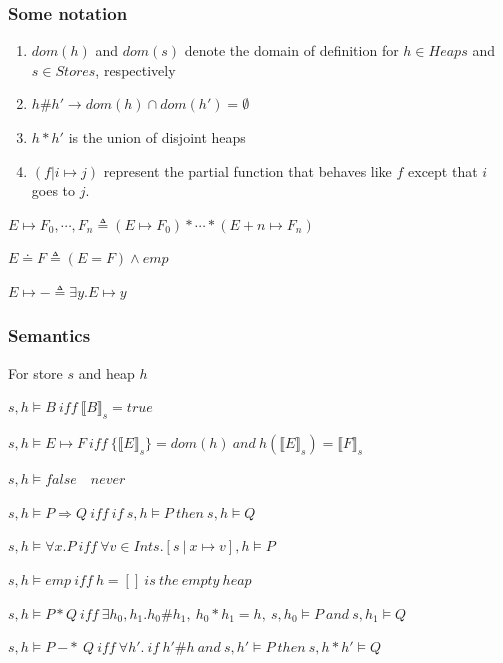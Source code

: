 \documentclass{beamer}
\begin{document}
    \begin{frame}
        \frametitle{Some notation}
        \begin{enumerate}
            \item $dom(h)$ and $dom(s)$ denote the domain of definition
            for $h \in Heaps$ and $s \in Stores$, respectively
            \bigskip
            \item $h\#h' \rightarrow dom(h) \cap dom(h') = \emptyset$
            \bigskip
            \item $ h \ast h'$ is the union of disjoint heaps
            \bigskip
            \item $(f | i \mapsto j)$ represent the partial function that behaves like $f$ except that $i$ goes to $j$.
        \end{enumerate}

        \bigskip
        $E \mapsto F_0,\cdots,F_n \triangleq (E \mapsto F_0) \ast \cdots \ast (E+n \mapsto F_n)$
        
        \medskip
        $E \doteq F \triangleq (E=F) \wedge emp$

        \medskip
        $ E \mapsto - \triangleq \exists y.E\mapsto y$
    \end{frame}
    \begin{frame}
        \frametitle{Semantics}
        
        For store $s$ and heap $h$
        \scriptsize
        \begin{card}
        \pause
        $s,h \models B\ iff\ \llbracket B \rrbracket_s = true$
       

        \bigskip
        $s,h \models  E \mapsto F\ iff\ \{\llbracket E \rrbracket_s\} = dom(h)\ and\ h(\llbracket E \rrbracket_s)=\llbracket F \rrbracket_s$
        
        
        \bigskip
        $s,h \models false \quad never $
   
        
        \bigskip
        $s,h \models  P \Rightarrow Q\ iff\ if\ s,h \models P\ then\ s,h \models Q$
        
        
        \bigskip
        $s,h \models  \forall x.P\ iff\ \forall v \in Ints. [s\ |\ x \mapsto v ],h \models P $
        \pause
        
        \bigskip
        $s,h \models  emp\ iff\ h=[]\ is\ the\ empty\ heap $
      
        \bigskip
        $s,h \models  P \ast Q\ iff\ \exists h_0, h_1. h_0 \# h_1,\ h_0 \ast h_1 = h,\ s,h_0 \models P\ and\ s,h_1 \models Q $
        
        \bigskip
        $s,h \models  P\ {-*}\ Q\ iff\ \forall h'.\ if\ h'\#h\ and\ s,h' \models P\ then\ s,h\ast h' \models Q$
       
        
        \end{card}
    \end{frame}
\end{document}
